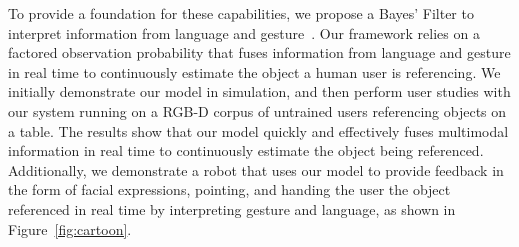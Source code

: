 \documentclass[a4paper, 11pt]{article} %
\begin{document}
To provide a foundation for these capabilities, we propose a Bayes' Filter to interpret information from language and gesture~\citep{thrun08}. Our framework relies on a factored observation probability that fuses information from language and gesture in real time to continuously estimate the object a human user is referencing. We initially demonstrate our model in simulation, and then perform user studies with our system running on a RGB-D corpus of untrained users referencing objects on a table. The results show that our model quickly and effectively fuses multimodal information in real time to continuously estimate the object being referenced. Additionally, we demonstrate a robot that uses our model to provide feedback in the form of facial expressions, pointing, and handing the user the object referenced in real time by interpreting gesture and language, as shown in Figure~\ref{fig:cartoon}.
\end{document}
